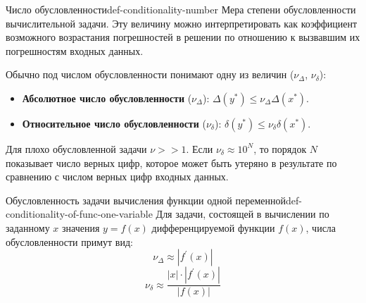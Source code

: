 \documentclass[14pt]{extarticle}
\begin{document}
    \begin{definition}{Число обусловленности}{def-conditionality-number}
        Мера степени обусловленности вычислительной задачи. Эту величину можно интерпретировать как коэффициент возможного возрастания погрешностей в решении по отношению к вызвавшим их погрешностям входных данных.
   
        \vspace{\baselineskip}
   
        Обычно под числом обусловленности понимают одну из величин ($\nu_{\Delta}$, $\nu_{\delta}$):
        \begin{itemize}
            \item \textbf{Абсолютное число обусловленности} ($\nu_{\Delta}$): $\Delta(y^{*}) \leq \nu_{\Delta}\Delta(x^{*})$.
            \item \textbf{Относительное число обусловленности} ($\nu_{\delta}$): $\delta(y^{*}) \leq \nu_{\delta}\delta(x^{*})$.
        \end{itemize}
    \end{definition}

    Для плохо обусловленной задачи $\nu >> 1$. Если $\nu_{\delta} \approx 10^{N}$, то порядок $N$ показывает число верных цифр, которое может быть утеряно в результате по сравнению с числом верных цифр входных данных.

    \begin{definition}{Обусловленность задачи вычисления функции одной переменной}{def-conditionality-of-func-one-variable}
        Для задачи, состоящей в вычислении по заданному $x$ значения $y = f(x)$ дифференцируемой функции $f(x)$, числа обусловленности примут вид:
        $$\nu_{\Delta} \approx |f^{'}(x)|$$
        $$\nu_{\delta} \approx \frac{|x| \cdot |f^{'}(x)|}{|f(x)|}$$
    \end{definition}
\end{document}
